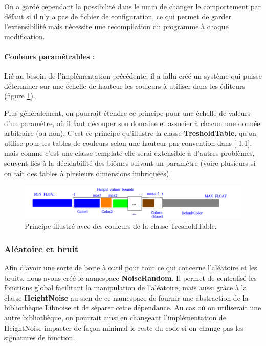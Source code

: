 \documentclass[a4paper]{article}
\begin{document}
On a gardé cependant la possibilité dans le main de changer le comportement par défaut si il n'y a pas de fichier de configuration, ce qui permet de garder l'extensibilité mais nécessite une recompilation du programme à chaque modification.

\paragraph{Couleurs paramétrables :}

Lié au besoin de l'implémentation précédente, il a fallu créé un système qui puisse déterminer sur une échelle de hauteur les couleurs à utiliser dans les éditeurs (figure \ref{archi_treshold}).

Plus généralement, on pourrait étendre ce principe pour une échelle de valeurs d'un paramètre, où il faut découper son domaine et associer à chacun une donnée arbitraire (ou non). C'est ce principe qu'illustre la classe \textbf{TresholdTable}, qu'on utilise pour les tables de couleurs selon une hauteur par convention dans [-1,1], mais comme c'est une classe template elle serai extensible à d'autres problèmes, souvent liés à la décidabilité des biômes suivant un paramètre (voire plusieurs si on fait des tables à plusieurs dimensions imbriquées).

\begin{figure}[!h]
        \begin{center} \includegraphics[width=\linewidth]{img/archi/example_treshold.png}\end{center}
        \caption{\label{archi_treshold}Principe illustré avec des couleurs de la classe TresholdTable.}
\end{figure}

\newpage
\subsubsection{Aléatoire et bruit}

Afin d'avoir une sorte de boite à outil pour tout ce qui concerne l'aléatoire et les bruits, nous avons créé le namespace \textbf{NoiseRandom}. Il permet de centralisé les fonctions global facilitant la manipulation de l'aléatoire, mais aussi grâce à la classe \textbf{HeightNoise} au sien de ce namespace de fournir une abstraction de la bibliothèque Libnoise et de séparer cette dépendance. Au cas où on utiliserait une autre bibliothèque, on pourrait ainsi en changeant l'implémentation de HeightNoise impacter de façon minimal le reste du code si on change pas les signatures de fonction.
\end{document}
